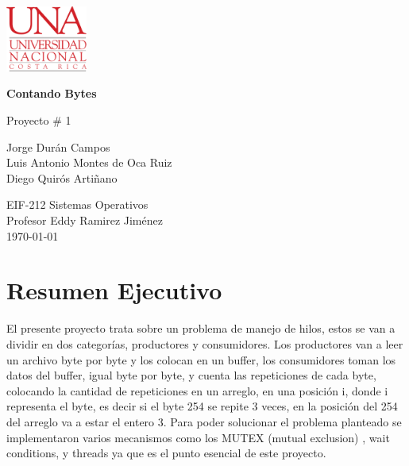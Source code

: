 \documentclass[10pt, article, natbib]{IEEEtran}
\begin{document}
\begin{titlepage}
	\includegraphics[width=0.2\textwidth]{./logo-UNA blanco.png}      
   	\begin{changemargin}{4.5cm}{0cm}
       	\textbf{\Huge Contando Bytes}

       	\vspace{0.2cm}
       	\LARGE Proyecto \# 1
            
       	\vspace{3cm}
		\Large
       	Jorge Durán Campos \\ 
       	Luis Antonio Montes de Oca Ruiz \\ 
       	Diego Quirós Artiñano \\ 

       	\vspace{3cm}
       
		EIF-212 Sistemas Operativos \\
       	Profesor Eddy Ramirez Jiménez \\
		       	
       	\vspace{3cm}
       	\today
	\end{changemargin}
\end{titlepage}

\onecolumn
    \renewcommand{\contentsname}{\large Índice \\ \hrulefill}
\tableofcontents
\setcounter{tocdepth}{2}
\newpage
 \renewcommand{\listfigurename}{\large Índice de fíguras \\ \hrulefill}
 \listoffigures
 \newpage
 \renewcommand{\listtablename}{\large Índice de tablas \\ \hrulefill}
 \listoftables
 \newpage


\section{Resumen Ejecutivo}
El presente proyecto trata sobre un problema de manejo de hilos, estos se van a dividir en dos categorías, productores y consumidores. Los productores van a leer un archivo byte por byte y los colocan en un buffer, los consumidores toman los datos del buffer, igual byte por byte, y cuenta las repeticiones de cada byte, colocando la cantidad de repeticiones en un arreglo, en una posición i, donde i representa el byte, es decir si el byte 254 se repite 3 veces, en la posición del 254 del arreglo va a estar el entero 3. Para poder solucionar el problema planteado se implementaron varios mecanismos como los MUTEX (mutual exclusion) \cite{whiletruethendream_2020_mutex}, wait conditions, y threads ya que es el punto esencial de este proyecto.\cite{threadsInCEducative} \cite{codevault_2020_short} \cite{portfoliocourses_2022_introduction} \cite{whiletruethendream_2018_programar}\\
\end{document}
